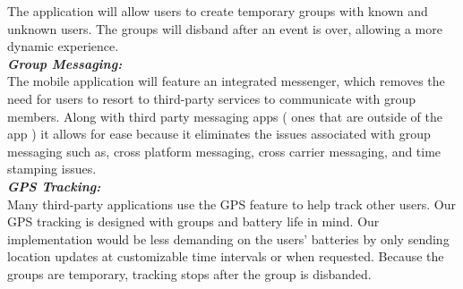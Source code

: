 The application will allow users to create temporary groups with known and unknown users. The groups will disband after an event is over, allowing a more dynamic experience. \\

\noindent
\textit{\textbf{Group Messaging:}} \\

The mobile application will feature an integrated messenger, which removes the need for users to resort to third-party services to communicate with group members. Along with third party messaging apps ( ones that are outside of the app ) it allows for ease because it eliminates the issues associated with group messaging such as, cross platform messaging, cross carrier messaging, and time stamping issues. \\

\noindent
\textit{\textbf{GPS Tracking:}}\\

Many third-party applications use the GPS feature to help track other users. Our GPS tracking is designed with groups and battery life in mind. Our implementation would be less demanding on the users’ batteries by only sending location updates at customizable time intervals or when requested. Because the groups are temporary, tracking stops after the group is disbanded. \\






